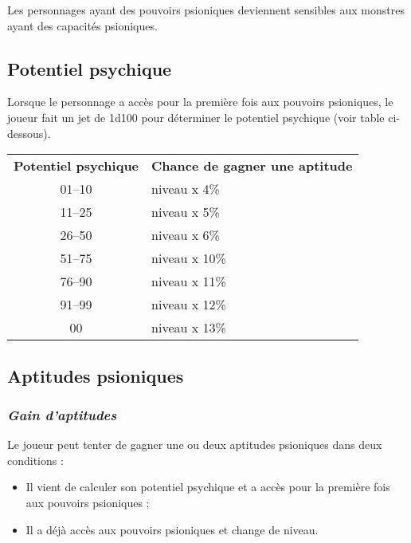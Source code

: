 \bigskip

Les personnages ayant des pouvoirs psioniques deviennent sensibles aux monstres ayant des capacités psioniques.

\subsection*{Potentiel psychique}

Lorsque le personnage a accès pour la première fois aux pouvoirs psioniques, le joueur fait un jet de 1d100 pour déterminer le potentiel psychique (voir table ci-dessous).
\bigskip

{\parindent3cm\begin{tabular}{cl}
\textbf{Potentiel psychique} & \textbf{Chance de gagner une aptitude} \\
01--10 & niveau x 4\% \\
11--25 & niveau x 5\% \\
26--50 & niveau x 6\% \\
51--75 & niveau x 10\% \\
76--90 & niveau x 11\% \\
91--99 & niveau x 12\% \\
\hspace{0.4cm}00 & niveau x 13\% \\
\end{tabular}}

\subsection*{Aptitudes psioniques}

\subsubsection*{\textit{Gain d'aptitudes}}
\label{aptitudes-gain}

Le joueur peut tenter de gagner une ou deux aptitudes psioniques dans deux conditions :

\bigskip

\begin{itemize}
\item Il vient de calculer son potentiel psychique et a accès pour la première fois aux pouvoirs psioniques ;
\item Il a déjà accès aux pouvoirs psioniques et change de niveau.
\end{itemize}

